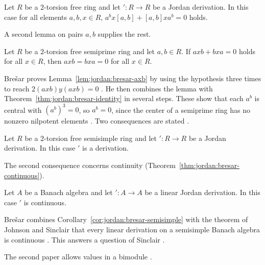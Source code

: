 \begin{theorem}\label{thm:jordan:bresar-identity}
Let $R$ be a $2$-torsion free ring and let $'\colon R\to R$ be a Jordan derivation.
In this case for all elements $a,b,x\in R$,
$a^{b}x[a,b]+[a,b]xa^{b}=0$ holds.
\end{theorem}

A second lemma on pairs $a,b$ supplies the rest.

\begin{lemma}\label{lem:jordan:bresar-axb}
Let $R$ be a $2$-torsion free semiprime ring and let $a,b\in R$. If $axb+bxa=0$ holds
for all $x\in R$, then $axb=bxa=0$ for all $x\in R$.
\end{lemma}

Brešar proves Lemma~\ref{lem:jordan:bresar-axb} by using the hypothesis three
times to reach $2(axb)y(axb)=0$ \cite[p.~1004]{Bresar1988}. He then combines
the lemma with Theorem~\ref{thm:jordan:bresar-identity} in several steps.
These show that each $a^{b}$ is central with $(a^{b})^{3}=0$, so $a^{b}=0$,
since the center of a semiprime ring has no nonzero nilpotent elements
\cite[p.~1005]{Bresar1988}. Two consequences are stated
\cite[pp.~1005--1006]{Bresar1988}.

\begin{corollary}\label{cor:jordan:bresar-semisimple}
Let $R$ be a $2$-torsion free semisimple ring and let $'\colon R\to R$ be a Jordan
derivation. In this case $'$ is a derivation.
\end{corollary}

The second consequence concerns continuity
(Theorem~\ref{thm:jordan:bresar-continuous}).

\begin{theorem}\label{thm:jordan:bresar-continuous}
Let $A$ be a Banach algebra and let $'\colon A\to A$ be a linear Jordan derivation.
In this case $'$ is continuous.
\end{theorem}

Brešar combines Corollary~\ref{cor:jordan:bresar-semisimple} with the theorem
of Johnson and Sinclair that every linear derivation on a semisimple Banach
algebra is continuous \cite[p.~1006]{Bresar1988}. This answers a question of
Sinclair \cite[p.~1006]{Bresar1988}.


The second paper allows values in a bimodule \cite[p.~411]{Bresar2005}.

